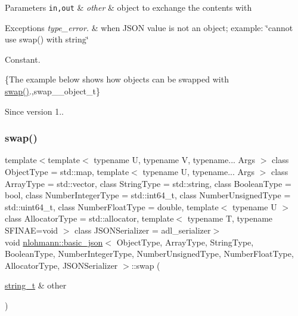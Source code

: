 \begin{DoxyParams}[1]{Parameters}
\mbox{\tt in,out}  & {\em other} & object to exchange the contents with\\
\hline
\end{DoxyParams}

\begin{DoxyExceptions}{Exceptions}
{\em type\+\_\+error.} & when J\+S\+ON value is not an object; example\+: {\ttfamily \char`\"{}cannot use swap() with string\char`\"{}}\\
\hline
\end{DoxyExceptions}
Constant.

\{The example below shows how objects can be swapped with {\ttfamily \mbox{\hyperlink{classnlohmann_1_1basic__json_a8c9d932353e1ab98a7dc2fc27e002031}{swap()}}}.,swap\+\_\+\+\_\+object\+\_\+t\}

\begin{DoxySince}{Since}
version 1.. 
\end{DoxySince}
\mbox{\label{classnlohmann_1_1basic__json_adaa1ed0a889d86c8e0216a3d66980f76}} 
\subsubsection{\texorpdfstring{swap()}{swap()}\hspace{0.1cm}{\footnotesize\ttfamily [4/4]}}
{\footnotesize\ttfamily template$<$template$<$ typename U, typename V, typename... Args $>$ class Object\+Type = std\+::map, template$<$ typename U, typename... Args $>$ class Array\+Type = std\+::vector, class String\+Type  = std\+::string, class Boolean\+Type  = bool, class Number\+Integer\+Type  = std\+::int64\+\_\+t, class Number\+Unsigned\+Type  = std\+::uint64\+\_\+t, class Number\+Float\+Type  = double, template$<$ typename U $>$ class Allocator\+Type = std\+::allocator, template$<$ typename T, typename S\+F\+I\+N\+A\+E=void $>$ class J\+S\+O\+N\+Serializer = adl\+\_\+serializer$>$ \\
void \mbox{\hyperlink{classnlohmann_1_1basic__json}{nlohmann\+::basic\+\_\+json}}$<$ Object\+Type, Array\+Type, String\+Type, Boolean\+Type, Number\+Integer\+Type, Number\+Unsigned\+Type, Number\+Float\+Type, Allocator\+Type, J\+S\+O\+N\+Serializer $>$\+::swap (\begin{DoxyParamCaption}\item[{\mbox{\hyperlink{classnlohmann_1_1basic__json_a61f8566a1a85a424c7266fb531dca005}{string\+\_\+t}} \&}]{other }\end{DoxyParamCaption})\hspace{0.3cm}{\ttfamily [inline]}}



